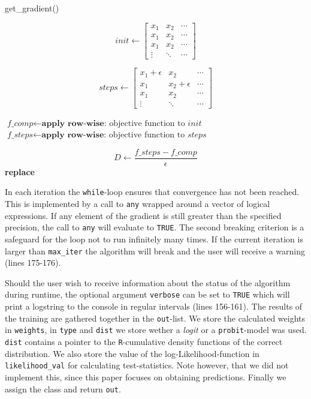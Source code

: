 \documentclass{article}
\begin{document}
\begin{algorithm}
\caption{get\_gradient()}\label{getGrad}
\begin{algorithmic}[1]
\State $$\textit{init} \gets \begin{bmatrix}
x_1 & x_2 & \cdots\\
x_1 & x_2 & \cdots\\
x_1 & x_2 & \cdots\\
\vdots & \ddots & \cdots
\end{bmatrix} $$

\State $$\textit{steps} \gets 
\begin{bmatrix}
x_1 + \epsilon & x_2 & \cdots\\
x_1 & x_2 + \epsilon & \cdots\\
x_1 & x_2 & \cdots\\
\vdots & \ddots & \cdots
\end{bmatrix}$$

\State $\textit{f\_comp} \gets \textbf{apply row-wise:} \text{ objective function to } \textit{init}$
\State $\textit{f\_steps} \gets \textbf{apply row-wise:} \text{ objective function to } \textit{steps}$
\EndProcedure

\State $$\textit{D} \gets \frac{f\_steps - f\_comp}{\epsilon}$$
 \textbf{replace} 
\EndIf
\EndProcedure
\end{algorithmic}
\end{algorithm}

In each iteration the \texttt{while}-loop ensures that convergence has not been reached. This is implemented by a call to \texttt{any} wrapped around a vector of logical expressions. If any element of the gradient is still greater than the specified precision, the call to \texttt{any} will evaluate to \texttt{TRUE}. The second breaking criterion is a safeguard for the loop not to run infinitely many times. If the current iteration is larger than \texttt{max\_iter} the algorithm will break and the user will receive a warning (lines 175-176). 



Should the user wish to receive information about the status of the algorithm during runtime, the optional argument \texttt{verbose} can be set to \texttt{TRUE} which will print a logstring to the console in regular intervals (lines 156-161). The results of the training are gathered together in the \texttt{out}-list. We store the calculated weights in \texttt{weights}, in \texttt{type} and \texttt{dist} we store wether a \textit{logit} or a \texttt{probit}-model was used. \texttt{dist} contains a pointer to the \texttt{R}-cumulative density functions of the correct distribution. We also store the value of the log-Likelihood-function in \texttt{likelihood\_val} for calculating test-statistics. Note however, that we did not implement this, since this paper focuses on obtaining predictions. Finally we assign the class and return \texttt{out}.
\end{document}
